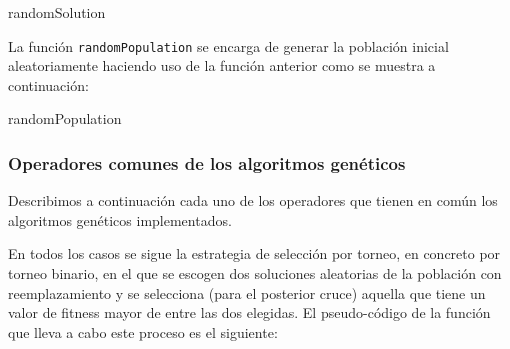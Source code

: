 \documentclass[10pt,a4paper]{article}
\begin{document}
	\begin{algorithm}[H]
		\DontPrintSemicolon
		\caption{\sc randomSolution}
	\end{algorithm}

La función \lstinline|randomPopulation| se encarga de generar la población inicial aleatoriamente haciendo uso de la función anterior como se muestra a continuación:

	\begin{algorithm}[H]
	\caption{\sc randomPopulation}
	\Begin{
		\For{i \textbf{in} $[0,size\_pop)$}{
			sol $\leftarrow$ $\operatorname{randomSolution}(m,matrix)$\\
			pop.solutions $\leftarrow$ pop.solutions $\cup$ $ \{sol\} $
		}
		$ pop.best\_sol $ $\leftarrow$ -1\\
		$ pop.best\_fitness $ $\leftarrow$ 0\\
		$\operatorname{evaluatePopulation}(pop,matrix,evaluations)$\\
		\Return pop
	}
\end{algorithm}

\subsubsection{Operadores comunes de los algoritmos genéticos}

Describimos a continuación cada uno de los operadores que tienen en común los algoritmos genéticos implementados. 

En todos los casos se sigue la estrategia de selección por torneo, en concreto por torneo binario, en el que se escogen dos soluciones aleatorias de la población con reemplazamiento y se selecciona (para el posterior cruce) aquella que tiene un valor de fitness mayor de entre las dos elegidas. El pseudo-código de la función que lleva a cabo este proceso es el siguiente:
\end{document}
